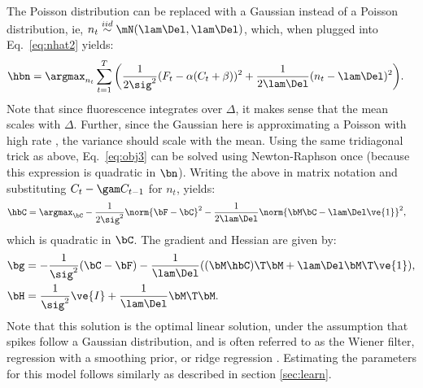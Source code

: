 The Poisson distribution can be replaced with a Gaussian instead of a Poisson distribution, ie,  $n_t \overset{iid}{\sim} \mN(\lam \Del, \lam \Del)$, which, when plugged into Eq.~\eqref{eq:nhat2} yields:
\begin{align} \label{eq:obj3}
\hbn &= \argmax_{n_t}  \sum_{t=1}^T \bigg( \frac{1}{2 \sig^2}(F_t - \alpha(C_t + \beta))^2  + 
 \frac{1}{2 \lam \Del}(n_t - \lam \Del)^2\bigg).
\end{align}
Note that since fluorescence integrates over $\Delta$, it makes sense that the mean scales with $\Delta$.  Further, since the Gaussian here is approximating a Poisson with high rate \cite{SjulsonMiesenbock07}, the variance should scale with the mean.  Using the same tridiagonal trick as above, Eq.~\eqref{eq:obj3} can be solved using Newton-Raphson once (because this expression is quadratic in $\bn$).  Writing the above in matrix notation and substituting $C_t - \gam C_{t-1}$ for $n_t$, yields:
\begin{align}   \label{eq:w2}
\hbC&= \argmax_{\bC} -\frac{1}{2\sig^2} \norm{\bF - \bC}^2 - \frac{1}{2\lam\Del} \norm{\bM \bC - \lam\Del\ve{1}}^2,
\end{align}
\noindent which is quadratic in $\bC$.  The gradient and Hessian are given by:
\begin{align}
\bg &= -\frac{1}{\sig^2} (\bC - \bF) - \frac{1}{\lam\Del} ( (\bM \hbC)\T \bM + \lam\Del \bM\T \ve{1}), \\
\bH &= \frac{1}{\sig^2} \ve{I} + \frac{1}{\lam\Del} \bM\T \bM.
\end{align}
Note that this solution is the optimal linear solution, under the assumption that spikes follow a Gaussian distribution, and is often referred to as the Wiener filter, regression with a smoothing prior, or ridge regression \cite{CONV04}.  Estimating the parameters for this model follows similarly as described in section \ref{sec:learn}.
